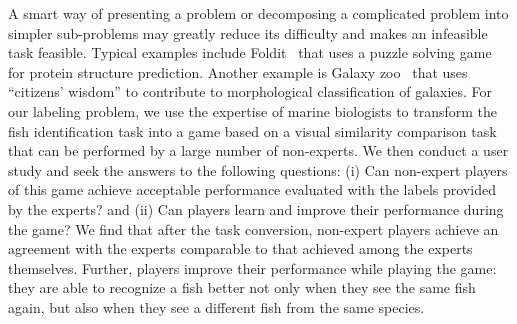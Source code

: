 A smart way of presenting a problem or decomposing a complicated problem 
into simpler sub-problems may greatly reduce its difficulty and makes an infeasible task feasible. 
Typical examples include Foldit~\cite{cooper2010:pred} that
uses a puzzle solving game for protein structure prediction.
Another example is Galaxy zoo~\cite{website:Galaxyzoo} 
that uses ``citizens' wisdom''
to contribute to morphological classification of galaxies.
%
For our labeling problem,  we use the expertise of marine biologists to
transform the fish identification task into a game based on a
visual similarity comparison task that can be performed by a large
number of non-experts. 
%
We then conduct a user study and seek the 
answers to the following questions:
(i) Can non-expert players of this game achieve acceptable
performance evaluated with the labels provided by the experts?
and (ii) Can players learn and improve their performance during the game?
%
We find that after the task conversion, non-expert players achieve an
agreement with the experts comparable to that achieved among the
experts themselves. Further, players improve their performance while
playing the game: they are able to recognize a fish better not only
when they see the same fish again, but also when
they see a different fish from the same species. 


